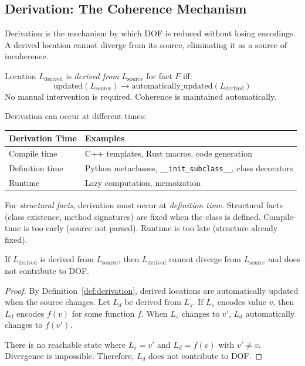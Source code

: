 \subsection{Derivation: The Coherence Mechanism}\label{sec:derivation}

Derivation is the mechanism by which DOF is reduced without losing encodings. A derived location cannot diverge from its source, eliminating it as a source of incoherence.

\begin{definition}[Derivation]\label{def:derivation}
Location $L_{\text{derived}}$ is \emph{derived from} $L_{\text{source}}$ for fact $F$ iff:
\[
\text{updated}(L_{\text{source}}) \rightarrow \text{automatically\_updated}(L_{\text{derived}})
\]
No manual intervention is required. Coherence is maintained automatically.
\end{definition}

Derivation can occur at different times:

\begin{center}
\begin{tabular}{lp{7cm}}
\toprule
\textbf{Derivation Time} & \textbf{Examples} \\
\midrule
Compile time & C++ templates, Rust macros, code generation \\
Definition time & Python metaclasses, \texttt{\_\_init\_subclass\_\_}, class decorators \\
Runtime & Lazy computation, memoization \\
\bottomrule
\end{tabular}
\end{center}

For \emph{structural facts}, derivation must occur at \emph{definition time}. Structural facts (class existence, method signatures) are fixed when the class is defined. Compile-time is too early (source not parsed). Runtime is too late (structure already fixed).

\begin{theorem}\label{thm:derivation-excludes}
If $L_{\text{derived}}$ is derived from $L_{\text{source}}$, then $L_{\text{derived}}$ cannot diverge from $L_{\text{source}}$ and does not contribute to DOF.
\end{theorem}

\begin{proof}
By Definition~\ref{def:derivation}, derived locations are automatically updated when the source changes. Let $L_d$ be derived from $L_s$. If $L_s$ encodes value $v$, then $L_d$ encodes $f(v)$ for some function $f$. When $L_s$ changes to $v'$, $L_d$ automatically changes to $f(v')$.

There is no reachable state where $L_s = v'$ and $L_d = f(v)$ with $v' \neq v$. Divergence is impossible. Therefore, $L_d$ does not contribute to DOF.
\end{proof}

